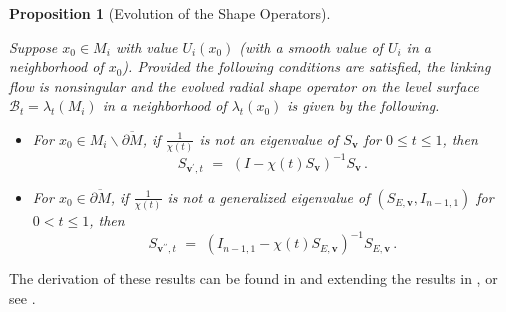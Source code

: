 \documentclass[10pt]{amsart}
\newtheorem{Corollary}[Thm]{Corollary}
\newtheorem{Proposition}[Thm]{Proposition}
\theoremstyle{definition}
\theoremstyle{definition}
\numberwithin{equation}{section}
\newcommand{\bdyM}{\partial M}
\def \bv {\mathbf {v}}
\def \cB {\mathcal{B}}
\def \gl {\lambda}
\begin{document}
\begin{Proposition}[Evolution of the Shape Operators]  \hfill
\label{Prop.II3.5}
\par 
Suppose $x_0 \in M_i$ with value $U_i(x_0)$ (with a smooth value of 
$U_i$ in a neighborhood of $x_0$).  Provided the following conditions are 
satisfied, the linking flow is nonsingular and the evolved radial shape 
operator on the level surface $\cB_t = \gl_t(M_i)$ in a neighborhood of 
$\gl_t(x_0)$ is given by the following.
\begin{itemize}
\item[1)] For $x_0 \in M_i \backslash \overline{\bdyM}$, 
if $\frac{1}{\chi(t)}$ is not an 
eigenvalue of $S_{\bv}$ for $0 \leq t \leq 1$, then
$$  S_{\bv^{\prime}, t} \,\,  = \,\,   (I - \chi(t) S_{\bv})^{-1}S_{\bv} 
\, .  $$
\item[2)]  For $x_0 \in \overline{\bdyM}$, if $\frac{1}{\chi(t)}$ is not a 
generalized eigenvalue of $(S_{E, \bv}, I_{n-1,1})$ for $0 < t \leq 1$, then
$$  S_{\bv^{\prime\prime}, t} \,\,  = \,\,   (I_{n-1,1} - \chi(t) S_{E, 
\bv})^{-1}S_{E, \bv} \, .  $$
\end{itemize}
\end{Proposition}
\par
The derivation of these results can be found in \cite[\S 7]{DG}  and 
\cite[Chap. 6]{Ga} extending the results in \cite{D2}, or see \cite[\S 
2]{D3}.  
\vspace{2ex}


\end{document}
